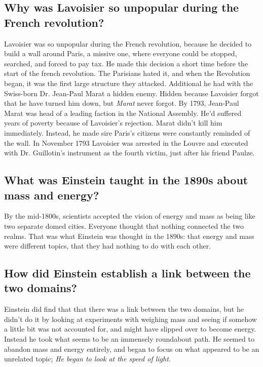 \subsection*{Why was Lavoisier so unpopular during the French revolution?}
Lavoisier was so unpopular during the French revolution, because he decided to build a wall around Paris, a missive one, where everyone could be stopped, searched, and forced to pay tax. He made this decision a short time before the start of the french revolution. The Parisians hated it, and when the Revolution began, it was the first large structure they attacked. Additional he had with the Swiss-born Dr. Jean-Paul Marat a hidden enemy. Hidden because Lavoisier forgot that he have turned him down, but \emph{Marat} never forgot. By 1793, Jean-Paul Marat was head of a leading faction in the National Assembly. He'd suffered years of poverty because of Lavoisier's rejection. Marat didn't kill him immediately. Instead, he made sire Paris's citizens were constantly reminded of the wall. In November 1793 Lavoisier was arrested in the Louvre and executed with Dr. Guillotin's instrument as the fourth victim, just after his friend Paulze.

\subsection*{What was Einstein taught in the 1890s about mass and energy?}
By the mid-1800s, scientists accepted the vision of energy and mass as being like two separate domed cities. Everyone thought that nothing connected the two realms. That was what Einstein was thought in the 1890s: that energy and mass were different topics, that they had nothing to do with each other.

\subsection*{How did Einstein establish a link between the two domains?}
Einstein did find that that there was a link between the two domains, but he didn't do it by looking at experiments with weighing mass and seeing if somehow a little bit was not accounted for, and might have slipped over to become energy. Instead he took what seems to be an immensely roundabout path. He seemed to abandon mass and energy entirely, and began to focus on what appeared to be an unrelated topic; \emph{He began to look at the speed of light.}
